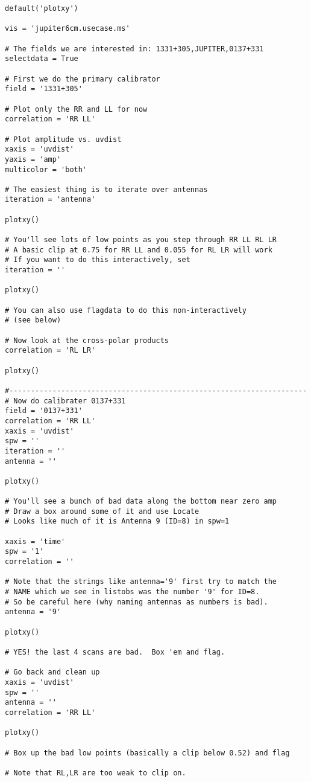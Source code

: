 \small
\begin{verbatim}
default('plotxy')

vis = 'jupiter6cm.usecase.ms'

# The fields we are interested in: 1331+305,JUPITER,0137+331
selectdata = True

# First we do the primary calibrator
field = '1331+305'

# Plot only the RR and LL for now
correlation = 'RR LL'

# Plot amplitude vs. uvdist
xaxis = 'uvdist'
yaxis = 'amp'
multicolor = 'both'

# The easiest thing is to iterate over antennas
iteration = 'antenna'

plotxy()

# You'll see lots of low points as you step through RR LL RL LR
# A basic clip at 0.75 for RR LL and 0.055 for RL LR will work
# If you want to do this interactively, set
iteration = ''

plotxy()

# You can also use flagdata to do this non-interactively
# (see below)

# Now look at the cross-polar products
correlation = 'RL LR'

plotxy()

#---------------------------------------------------------------------
# Now do calibrater 0137+331
field = '0137+331'
correlation = 'RR LL'
xaxis = 'uvdist'
spw = ''
iteration = ''
antenna = ''

plotxy()

# You'll see a bunch of bad data along the bottom near zero amp
# Draw a box around some of it and use Locate
# Looks like much of it is Antenna 9 (ID=8) in spw=1

xaxis = 'time'
spw = '1'
correlation = ''

# Note that the strings like antenna='9' first try to match the 
# NAME which we see in listobs was the number '9' for ID=8.
# So be careful here (why naming antennas as numbers is bad).
antenna = '9'

plotxy()

# YES! the last 4 scans are bad.  Box 'em and flag.

# Go back and clean up
xaxis = 'uvdist'
spw = ''
antenna = ''
correlation = 'RR LL'

plotxy()

# Box up the bad low points (basically a clip below 0.52) and flag

# Note that RL,LR are too weak to clip on.


\end{verbatim}
